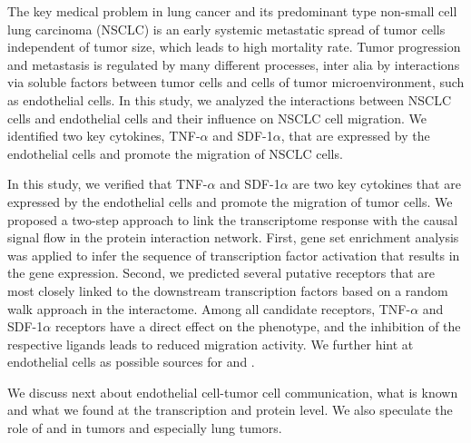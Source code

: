 The key medical problem in lung cancer and its predominant type non-small 
cell lung carcinoma (NSCLC) is an early systemic metastatic spread of tumor cells 
independent of tumor size, which leads to high mortality rate. Tumor progression 
and metastasis is regulated by many different processes, inter alia by interactions 
via soluble factors between tumor cells and cells of tumor microenvironment, such as 
endothelial cells. In this study, we analyzed the interactions between NSCLC cells 
and endothelial cells and their influence on NSCLC cell migration. We identified 
two key cytokines, TNF-$\alpha$ and SDF-1$\alpha$, that are expressed by the 
endothelial cells and promote the migration of NSCLC cells.

In this study, we verified that TNF-$\alpha$ and SDF-1$\alpha$ are two
key cytokines that are expressed by the endothelial cells and promote the migration
of tumor cells. We proposed a two-step approach to link the transcriptome response
with the causal signal flow in the protein interaction network. First, gene set
enrichment analysis was applied to infer the sequence of transcription factor
activation that results in the gene expression. Second, we predicted several
putative receptors that are most closely linked to the downstream transcription
factors based on 
a random walk approach in the interactome. Among all candidate receptors,
TNF-$\alpha$ and SDF-1$\alpha$ receptors have a direct effect on the phenotype,
and the inhibition of the respective ligands leads to reduced migration 
activity. We further
hint at endothelial cells as possible sources for \tnfa and \sdfonea.

We discuss next about endothelial cell-tumor cell communication, what is known and what we found at the transcription and protein level.
We also speculate the role of \tnfa and \sdfonea in tumors and especially lung tumors.

